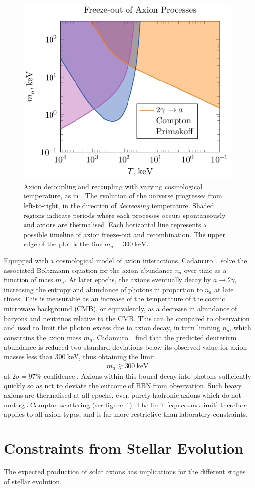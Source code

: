 \begin{figure}
	\centering
	\includegraphics{diagrams/cosmo-freeze-out.pdf}
	\caption{
		Axion decoupling and recoupling with varying cosmological temperature, as in \cite{Cadamuro_2011}.
		The evolution of the universe progresses from left-to-right, in the direction of \emph{decreasing} temperature.
		Shaded regions indicate periods where each processes occurs spontaneously and axions are thermalised.
		Each horizontal line represents a possible timeline of axion freeze-out and recombination.
		The upper edge of the plot is the line $m_a = \SI{300}{\kilo\eV}$.
	}
	\label{fig:axion-freeze-out}
\end{figure}


Equipped with a cosmological model of axion interactions, Cadamuro \etal.\ solve the associated Boltzmann equation for the axion abundance $n_a$ over time as a function of mass $m_a$.
At later epochs, the axions eventually decay by $a \to 2γ$, increasing the entropy and abundance of photons in proportion to $n_a$ at late times.
This is measurable as an increase of the temperature of the cosmic microwave background (CMB), or equivalently, as a decrease in abundance of baryons and neutrinos relative to the CMB.
This can be compared to observation and used to limit the photon excess due to axion decay, in turn limiting $n_a$, which constrains the axion mass $m_a$.
Cadamuro \etal.\ find that the predicted deuterium abundance is reduced two standard deviations below its observed value for axion masses less than $\SI{300}{\kilo\eV}$, thus obtaining the limit
\begin{align}
	m_a \gtrsim \SI{300}{\kilo\eV}
	\label{eqn:cosmo-limit}
\end{align}
at $2σ = 97\%$ confidence \cite{Cadamuro_2011}.
Axions within this bound decay into photons sufficiently quickly so as not to deviate the outcome of BBN from observation.
Such heavy axions are thermalised at all epochs, even purely hadronic axions which do not undergo Compton scattering (see figure~\ref{fig:axion-freeze-out}).
The limit \eqref{eqn:cosmo-limit} therefore applies to all axion types, and is far more restrictive than laboratory constraints.



\section{Constraints from Stellar Evolution}

The expected production of solar axions has implications for the different stages of stellar evolution.